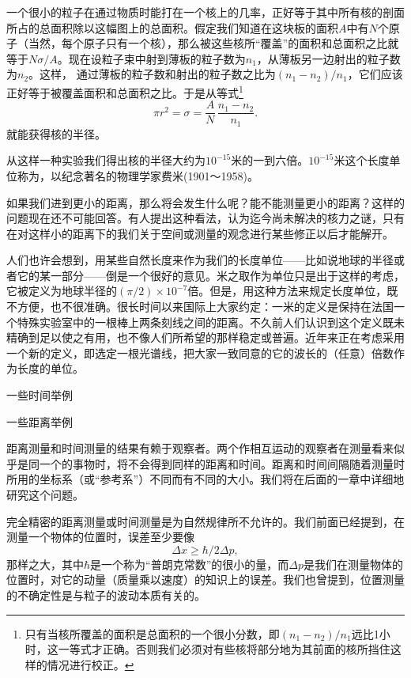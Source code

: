 \documentclass[11pt,oneside]{book}
\begin{document}
\begin{common-format}
一个很小的粒子在通过物质时能打在一个核上的几率，正好等于其中所有核的剖面所占的总面积除以这幅图上的总面积。假定我们知道在这块板的面积$A$中有$N$个原子（当然，每个原子只有一个核），那么被这些核所“覆盖”的面积和总面积之比就等于$N \sigma / A$。现在设粒子束中射到薄板的粒子数为$n_1$，从薄板另一边射出的粒子数为$n_2$。这样， 通过薄板的粒子数和射出的粒子数之比为$(n_1-n_2)/n_1$，它们应该正好等于被覆盖面积和总面积之比。于是从等式\footnote{只有当核所覆盖的面积是总面积的一个很小分数，即$(n_1-n_2)/n_1$远比1小时，这一等式才正确。否则我们必须对有些核将部分地为其前面的核所挡住这样的情况进行校正。}
\begin{equation*}
\pi r^2=\sigma=\frac{A}{N}\,
\frac{n_1-n_2}{n_1}.
\end{equation*}
就能获得核的半径。

从这样一种实验我们得出核的半径大约为$10^{-15}$米的一到六倍。$10^{-15}$米这个长度单位称为，以纪念著名的物理学家费米(1901～1958)。

如果我们进到更小的距离，那么将会发生什么呢？能不能测量更小的距离？这样的问题现在还不可能回答。有人提出这种看法，认为迄今尚未解决的核力之谜，只有在对这样小的距离下的我们关于空间或测量的观念进行某些修正以后才能解开。

人们也许会想到，用某些自然长度来作为我们的长度单位——比如说地球的半径或者它的某一部分——倒是一个很好的意见。米之取作为单位只是出于这样的考虑，它被定义为地球半径的$(\pi/2)\times10^{-7}$倍。但是，用这种方法来规定长度单位，既不方便，也不很准确。很长时间以来国际上大家约定：一米的定义是保持在法国一个特殊实验室中的一根棒上两条刻线之间的距离。不久前人们认识到这个定义既未精确到足以使之有用，也不像人们所希望的那样稳定或普遍。近年来正在考虑采用一个新的定义，即选定一根光谱线，把大家一致同意的它的波长的（任意）倍数作为长度的单位。

\begin{fig}{一些时间举例}
\label{fig:一些时间举例}
\end{fig}

\begin{fig}{一些距离举例}
\label{fig:一些距离举例}
\end{fig}

\noindent\dotfill

距离测量和时间测量的结果有赖于观察者。两个作相互运动的观察者在测量看来似乎是同一个的事物时，将不会得到同样的距离和时间。距离和时间间隔随着测量时所用的坐标系（或“参考系”）不同而有不同的大小。我们将在后面的一章中详细地研究这个问题。

完全精密的距离测量或时间测量是为自然规律所不允许的。我们前面已经提到，在测量一个物体的位置时，误差至少要像
\begin{equation*}
\Delta x\geq\hbar/2\Delta p,
\end{equation*}
那样之大，其中$\hbar$是一个称为“普朗克常数”的很小的量，而$\Delta p$是我们在测量物体的位置时，对它的动量（质量乘以速度）的知识上的误差。我们也曾提到，位置测量的不确定性是与粒子的波动本质有关的。


\end{common-format}
\end{document}
